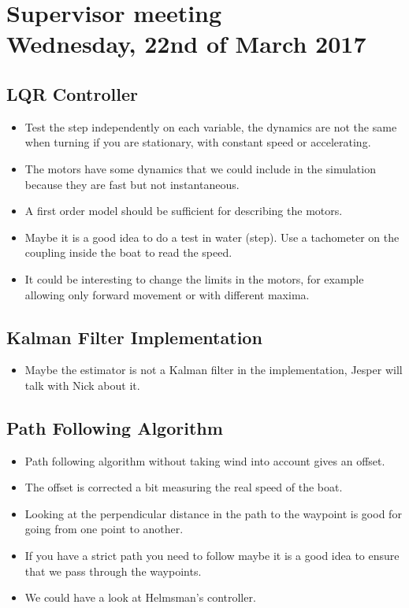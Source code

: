 
\renewcommand{\vec}[1]{\boldsymbol{\mathbf{#1}}}


\section*{Supervisor meeting\\ \small Wednesday, 22nd of March 2017}
\subsection{LQR Controller}
\begin{itemize}
	\item Test the step independently on each variable, the dynamics are not the same when turning if you are stationary, with constant speed or accelerating.
    \item The motors have some dynamics that we could include in the simulation because they are fast but not instantaneous.
    \item A first order model should be sufficient for describing the motors.
    \item Maybe it is a good idea to do a test in water (step). Use a tachometer on the coupling inside the boat to read the speed.
    \item It could be interesting to change the limits in the motors, for example allowing only forward movement or with different maxima.
\end{itemize}
\subsection{Kalman Filter Implementation}
\begin{itemize}
	\item Maybe the estimator is not a Kalman filter in the implementation, Jesper will talk with Nick about it.
\end{itemize}
\subsection{Path Following Algorithm}
\begin{itemize}
	\item Path following algorithm without taking wind into account gives an offset.
    \item The offset is corrected a bit measuring the real speed of the boat.
    \item Looking at the perpendicular distance in the path to the waypoint is good for going from one point to another.
    \item If you have a strict path you need to follow maybe it is a good idea to ensure that we pass through the waypoints.
    \item We could have a look at Helmsman's controller.
\end{itemize}
